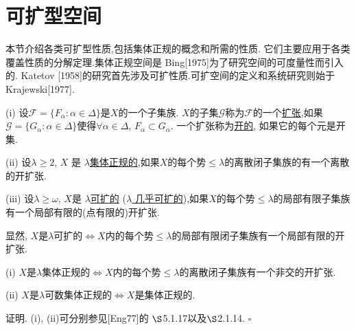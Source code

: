 \documentclass[main.tex]{subfiles}
\begin{document}
\chapter{可扩型空间}\label{ch3}
本节介绍各类可扩型性质,包括集体正规的概念和所需的性质.
它们主要应用于各类覆盖性质的分解定理.集体正规空间是 Bing[1975]为了研究空间的可度量性而引入的. Katetov [1958]的研究首先涉及可扩性质.可扩空间的定义和系统研究则始于
Krajewski[1977].

\begin{definition}
	\textnormal{(i)} 设$\mathscr{F}=\{F_\alpha:\alpha\in\Delta\}$是$X$的一个子集族.
	$X$的子集$\mathscr{G}$称为$\mathscr{F}$的一个\underline{扩张},如果
	$\mathscr{G}=\{G_\alpha:\alpha\in\Delta\}$使得$\forall\alpha\in\Delta$, $F_\alpha\subset G_\alpha$. 一个扩张称为\underline{开的}, 如果它的每个元是开集.
	
	\textnormal{(ii)} 设$\lambda\ge 2$, $X$ 是 \underline{$\lambda$集体正规的},如果$X$的每个势$\le\lambda$的离散闭子集族的有一个离散的开扩张.
	
	\textnormal{(iii)} 设$\lambda\ge \omega$, $X$是 \underline{$\lambda$可扩的}
	\textnormal{(}\underline{$\lambda$ 几乎可扩的}\textnormal{)},如果$X$的每个势$\le\lambda$的局部有限子集族有一个局部有限的\textnormal{(}点有限的\textnormal{)}开扩张.
\end{definition}

\begin{note}
	显然, $X$是$\lambda$可扩的$\Leftrightarrow X$内的每个势$\le\lambda$的局部有限闭子集族有一个局部有限的开扩张.
\end{note}

\begin{fact}
	\textnormal{(i)} 	$X$是$\lambda$集体正规的$\Leftrightarrow X$内的每个势$\le\lambda$的离散闭子集族有一个非交的开扩张.
	
	\textnormal{(ii)} $X$是$\lambda$可数集体正规的$\Leftrightarrow X$是集体正规的.
\end{fact}

证明. (i), (ii)可分别参见[Eng77]的 $\S$5.1.17以及$\S$2.1.14. $\square$
\end{document}
